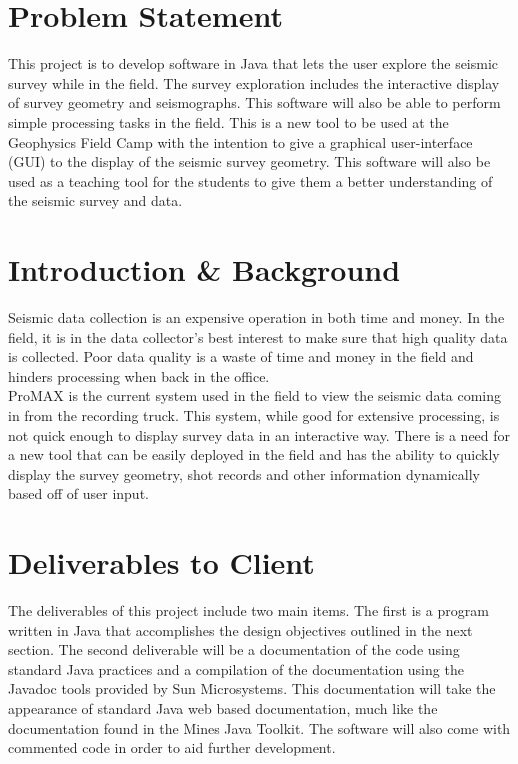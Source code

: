 \documentclass[12pt]{article}
\begin{document}
\newpage
\tableofcontents
\listoffigures
\listoftables
\newpage

\section{Problem Statement}

This project is to develop software in Java that lets the user explore the seismic survey while in the field. The survey exploration includes the interactive display of survey geometry and seismographs. This software will also be able to perform simple processing tasks in the field. This is a new tool to be used at the Geophysics Field Camp with the intention to give a graphical user-interface (GUI) to the display of the seismic survey geometry. This software will also be used as a teaching tool for the students to give them a better understanding of the seismic survey and data.

\section{Introduction \& Background}

Seismic data collection is an expensive operation in both time and money. In the field, it is in the data collector's best interest to make sure that high quality data is collected. Poor data quality is a waste of time and money in the field and hinders processing when back in the office. \\

ProMAX is the current system used in the field to view the seismic data coming in from the recording truck. This system, while good for extensive processing, is not quick enough to display survey data in an interactive way. There is a need for a new tool that can be easily deployed in the field and has the ability to quickly display the survey geometry, shot records and other information dynamically based off of user input.

\section{Deliverables to Client}

The deliverables of this project include two main items. The first is a program written in Java that accomplishes the design objectives outlined in the next section. The second deliverable will be a documentation of the code using standard Java practices and a compilation of the documentation using the Javadoc tools provided by Sun Microsystems. This documentation will take the appearance of standard Java web based documentation, much like the documentation found in the Mines Java Toolkit. The software will also come with commented code in order to aid further development. 
\end{document}
